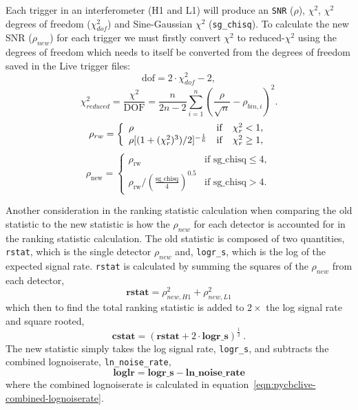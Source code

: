 Each trigger in an interferometer (H1 and L1) will produce an \verb|SNR| ($\rho$), $\chi^{2}$, $\chi^{2}$ degrees of freedom ($\chi^{2}_{dof}$) and Sine-Gaussian $\chi^{2}$ (\verb|sg_chisq|). To calculate the new SNR ($\rho_{new}$) for each trigger we must firstly convert $\chi^{2}$ to reduced-$\chi^{2}$ using the degrees of freedom which needs to itself be converted from the degrees of freedom saved in the Live trigger files:
%
\begin{equation}
\text{dof} = 2 \cdot \chi^{2}_{dof} - 2,
\end{equation}
%
\begin{equation}
  \chi_{reduced}^{2} = \frac{\chi^{2}}{\textrm{DOF}} = \frac{n}{2n - 2} \sum_{i=1}^n \left(\frac{\rho}{\sqrt{n}} - \rho_{bin,i}\right)^2.
  \label{eqn:chi_squared}
\end{equation}
%
\begin{equation}
\rho_{rw} =  \left\{  \begin{array}{l@{\quad}cr} 
\rho & \mathrm{if} & \chi_{r}^{2} < 1, \\  
\rho [(1 + (\chi_{r}^{2})^3)/2]^{-\frac{1}{6}} &  \mathrm{if} & \chi_{r}^{2} \ge 1,   
\end{array}\right.
\label{eqn:reweighting}
\end{equation}
%
\begin{equation}
\rho_{\text{new}} = 
\begin{cases} 
\rho_{\text{rw}} & \text{if } \text{sg\_chisq} \leq 4, \\  
\rho_{\text{rw}}  / \left(\frac{\text{sg\_chisq}}{4}\right)^{0.5} & \text{if } \text{sg\_chisq} > 4.
\end{cases}
\label{eqn:reweighting}
\end{equation}

Another consideration in the ranking statistic calculation when comparing the old statistic to the new statistic is how the $\rho_{new}$ for each detector is accounted for in the ranking statistic calculation. The old statistic is composed of two quantities, \verb|rstat|, which is the single detector $\rho_{new}$ and, \verb|logr_s|, which is the log of the expected signal rate. \verb|rstat| is calculated by summing the squares of the $\rho_{new}$ from each detector,
%
\begin{equation}
    \textbf{rstat} = \rho_{new, H1}^{2} + \rho_{new, L1}^{2}
\end{equation}
%
which then to find the total ranking statistic is added to $2 \times$ the log signal rate and square rooted,
%
\begin{equation}
    \textbf{cstat} = (\textbf{rstat} + 2 \cdot \textbf{logr\_s})^{\frac{1}{2}} \ .
\end{equation}
%
The new statistic simply takes the log signal rate, \verb|logr_s|, and subtracts the combined lognoiserate, \verb|ln_noise_rate|,
%
\begin{equation}
    \textbf{loglr} = \textbf{logr\_s} - \textbf{ln\_noise\_rate}
\end{equation}
%
where the combined lognoiserate is calculated in equation~\ref{eqn:pycbclive-combined-lognoiserate}.

